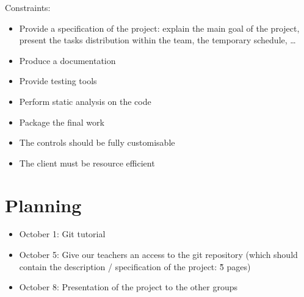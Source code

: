 \documentclass{article}
\begin{document}
\bigskip
Constraints:
\begin{itemize}
	\item Provide a specification of the project: explain the main goal of the project, present the tasks distribution within the team, the temporary schedule, \dots
	\item Produce a documentation
	\item Provide testing tools
	\item Perform static analysis on the code
	\item Package the final work
\end{itemize}
\begin{itemize}
    \item The controls should be fully customisable
    \item The client must be resource efficient
\end{itemize}

\section{Planning}
\begin{itemize}
	\item October 1: Git tutorial
	\item October 5: Give our teachers an access to the git repository (which should contain the description / specification of the project: \~5 pages)
	\item October 8: Presentation of the project to the other groups
\end{itemize}
\end{document}
